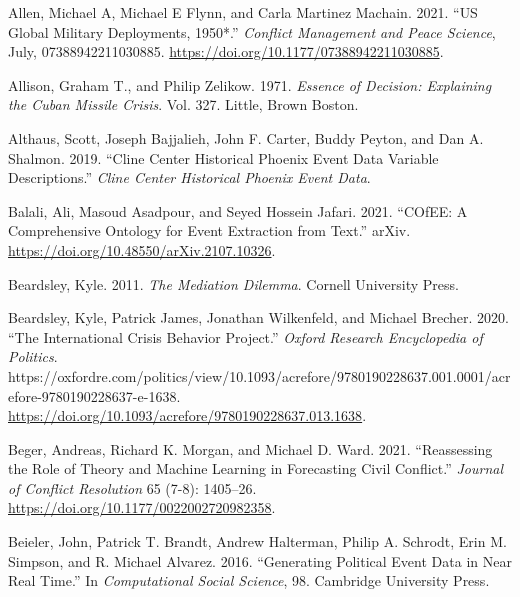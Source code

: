 \documentclass{article}
\newlength{\cslhangindent}
\newlength{\cslentryspacingunit} %
\newenvironment{CSLReferences}[2] %
 {%
  \setlength{\parindent}{0pt}
  \ifodd #1
  \let\oldpar\par
  \def\par{\hangindent=\cslhangindent\oldpar}
  \fi
  \setlength{\parskip}{#2\cslentryspacingunit}
 }%
 {}
\begin{document}
\hypertarget{refs}{}
\begin{CSLReferences}{1}{0}
\leavevmode{}%
Allen, Michael A, Michael E Flynn, and Carla Martinez Machain. 2021.
{``{US} Global Military Deployments, 1950*.''}
\emph{Conflict Management and Peace Science}, July, 07388942211030885.
\url{https://doi.org/10.1177/07388942211030885}.

\leavevmode{}%
Allison, Graham T., and Philip Zelikow. 1971. \emph{Essence of Decision:
{Explaining} the {Cuban} Missile Crisis}. Vol. 327. {Little, Brown
Boston}.

\leavevmode{}%
Althaus, Scott, Joseph Bajjalieh, John F. Carter, Buddy Peyton, and Dan
A. Shalmon. 2019. {``Cline {Center Historical Phoenix Event Data
Variable Descriptions}.''} \emph{Cline Center Historical Phoenix Event
Data}.

\leavevmode{}%
Balali, Ali, Masoud Asadpour, and Seyed Hossein Jafari. 2021.
{``{COfEE}: {A Comprehensive Ontology} for {Event Extraction} from
Text.''} {arXiv}. \url{https://doi.org/10.48550/arXiv.2107.10326}.

\leavevmode{}%
Beardsley, Kyle. 2011. \emph{The Mediation Dilemma}. {Cornell University
Press}.

\leavevmode{}%
Beardsley, Kyle, Patrick James, Jonathan Wilkenfeld, and Michael
Brecher. 2020. {``The {International Crisis Behavior Project}.''}
\emph{Oxford Research Encyclopedia of Politics}.
https://oxfordre.com/politics/view/10.1093/acrefore/9780190228637.001.0001/acrefore-9780190228637-e-1638.
\url{https://doi.org/10.1093/acrefore/9780190228637.013.1638}.

\leavevmode{}%
Beger, Andreas, Richard K. Morgan, and Michael D. Ward. 2021.
{``Reassessing the {Role} of {Theory} and {Machine Learning} in
{Forecasting Civil Conflict}.''} \emph{Journal of Conflict Resolution}
65 (7-8): 1405--26. \url{https://doi.org/10.1177/0022002720982358}.

\leavevmode{}%
Beieler, John, Patrick T. Brandt, Andrew Halterman, Philip A. Schrodt,
Erin M. Simpson, and R. Michael Alvarez. 2016. {``Generating Political
Event Data in Near Real Time.''} In \emph{Computational Social Science},
98. {Cambridge University Press}.


\end{CSLReferences}
\end{document}
